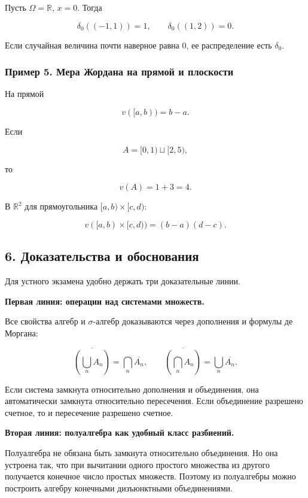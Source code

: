 \documentclass[
  11pt,
  a4paper,
]{article}
\begin{document}
Пусть \(\Omega=\mathbb R\), \(x=0\). Тогда

\[
\delta_0((-1,1))=1,\qquad \delta_0((1,2))=0.
\]

Если случайная величина почти наверное равна \(0\), ее распределение
есть \(\delta_0\).

\subsubsection{Пример 5. Мера Жордана на прямой и
плоскости}\label{ux43fux440ux438ux43cux435ux440-5.-ux43cux435ux440ux430-ux436ux43eux440ux434ux430ux43dux430-ux43dux430-ux43fux440ux44fux43cux43eux439-ux438-ux43fux43bux43eux441ux43aux43eux441ux442ux438}

На прямой

\[
v([a,b))=b-a.
\]

Если

\[
A=[0,1)\sqcup[2,5),
\]

то

\[
v(A)=1+3=4.
\]

В \(\mathbb R^2\) для прямоугольника \([a,b)\times[c,d)\):

\[
v([a,b)\times[c,d))=(b-a)(d-c).
\]

\subsection{6. Доказательства и
обоснования}\label{ux434ux43eux43aux430ux437ux430ux442ux435ux43bux44cux441ux442ux432ux430-ux438-ux43eux431ux43eux441ux43dux43eux432ux430ux43dux438ux44f}

Для устного экзамена удобно держать три доказательные линии.

\textbf{Первая линия: операции над системами множеств.}

Все свойства алгебр и \(\sigma\)-алгебр доказываются через дополнения и
формулы де Моргана:

\[
\overline{\left(\bigcup_n A_n\right)}=\bigcap_n \overline{A_n},\qquad
\overline{\left(\bigcap_n A_n\right)}=\bigcup_n \overline{A_n}.
\]

Если система замкнута относительно дополнения и объединения, она
автоматически замкнута относительно пересечения. Если объединение
разрешено счетное, то и пересечение разрешено счетное.

\textbf{Вторая линия: полуалгебра как удобный класс разбиений.}

Полуалгебра не обязана быть замкнута относительно объединения. Но она
устроена так, что при вычитании одного простого множества из другого
получается конечное число простых множеств. Поэтому из полуалгебры можно
построить алгебру конечными дизъюнктными объединениями.
\end{document}

